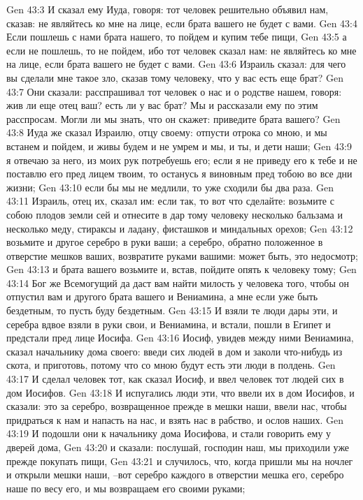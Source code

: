 Gen 43:3  И сказал ему Иуда, говоря: тот человек решительно объявил нам, сказав: не являйтесь ко мне на лице, если брата вашего не будет с вами.
Gen 43:4  Если пошлешь с нами брата нашего, то пойдем и купим тебе пищи,
Gen 43:5  а если не пошлешь, то не пойдем, ибо тот человек сказал нам: не являйтесь ко мне на лице, если брата вашего не будет с вами.
Gen 43:6  Израиль сказал: для чего вы сделали мне такое зло, сказав тому человеку, что у вас есть еще брат?
Gen 43:7  Они сказали: расспрашивал тот человек о нас и о родстве нашем, говоря: жив ли еще отец ваш? есть ли у вас брат? Мы и рассказали ему по этим расспросам. Могли ли мы знать, что он скажет: приведите брата вашего?
Gen 43:8  Иуда же сказал Израилю, отцу своему: отпусти отрока со мною, и мы встанем и пойдем, и живы будем и не умрем и мы, и ты, и дети наши;
Gen 43:9  я отвечаю за него, из моих рук потребуешь его; если я не приведу его к тебе и не поставлю его пред лицем твоим, то останусь я виновным пред тобою во все дни жизни;
Gen 43:10  если бы мы не медлили, то уже сходили бы два раза.
Gen 43:11  Израиль, отец их, сказал им: если так, то вот что сделайте: возьмите с собою плодов земли сей и отнесите в дар тому человеку несколько бальзама и несколько меду, стираксы и ладану, фисташков и миндальных орехов;
Gen 43:12  возьмите и другое серебро в руки ваши; а серебро, обратно положенное в отверстие мешков ваших, возвратите руками вашими: может быть, это недосмотр;
Gen 43:13  и брата вашего возьмите и, встав, пойдите опять к человеку тому;
Gen 43:14  Бог же Всемогущий да даст вам найти милость у человека того, чтобы он отпустил вам и другого брата вашего и Вениамина, а мне если уже быть бездетным, то пусть буду бездетным.
Gen 43:15  И взяли те люди дары эти, и серебра вдвое взяли в руки свои, и Вениамина, и встали, пошли в Египет и предстали пред лице Иосифа.
Gen 43:16  Иосиф, увидев между ними Вениамина, сказал начальнику дома своего: введи сих людей в дом и заколи что-нибудь из скота, и приготовь, потому что со мною будут есть эти люди в полдень.
Gen 43:17  И сделал человек тот, как сказал Иосиф, и ввел человек тот людей сих в дом Иосифов.
Gen 43:18  И испугались люди эти, что ввели их в дом Иосифов, и сказали: это за серебро, возвращенное прежде в мешки наши, ввели нас, чтобы придраться к нам и напасть на нас, и взять нас в рабство, и ослов наших.
Gen 43:19  И подошли они к начальнику дома Иосифова, и стали говорить ему у дверей дома,
Gen 43:20  и сказали: послушай, господин наш, мы приходили уже прежде покупать пищи,
Gen 43:21  и случилось, что, когда пришли мы на ночлег и открыли мешки наши, --вот серебро каждого в отверстии мешка его, серебро наше по весу его, и мы возвращаем его своими руками;
